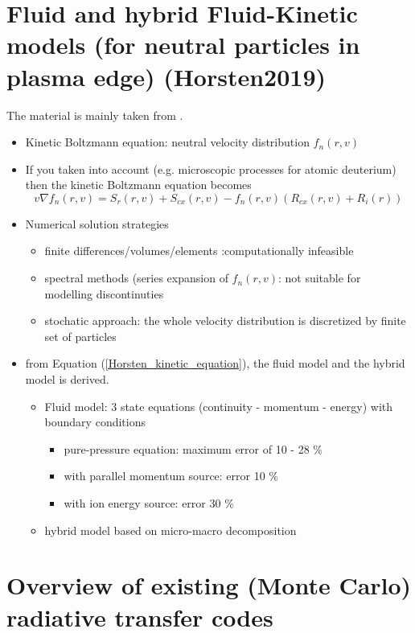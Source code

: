 \documentclass[../main/main.tex]{subfiles}
\begin{document}
\section{Fluid and hybrid Fluid-Kinetic models (for neutral particles in plasma edge) (Horsten2019)}
The material is mainly taken from \cite{HorstenNiels2019}.
\begin{itemize}
\item Kinetic Boltzmann equation: neutral velocity distribution $f_n(r,v)$
\item If you taken into account (e.g. microscopic processes for atomic deuterium) then the kinetic Boltzmann equation becomes 
\begin{equation}
v\nabla f_n(r,v) = S_r(r,v) + S_{cx}(r,v) - f_n(r,v)(R_{cx}(r,v)+R_i(r))
\label{Horsten_kinetic_equation}
\end{equation}

\item Numerical solution strategies
\begin{itemize}
\item finite differences/volumes/elements :computationally infeasible
\item spectral methods (series expansion of $f_n(r,v)$: not suitable for modelling discontinuties
\item stochatic approach: the whole velocity distribution is discretized by finite set of particles
\end{itemize}  

\item from Equation (\ref{Horsten_kinetic_equation}), the fluid model and the hybrid model is derived.
\begin{itemize}
\item Fluid model: 3 state equations (continuity -  momentum - energy) with boundary conditions
\begin{itemize}
\item pure-pressure equation: maximum error of 10 - 28 \% 
\item with parallel momentum source: error 10 \%
\item with ion energy source: error 30 \% 
\end{itemize} 

\item hybrid model based on micro-macro decomposition
\end{itemize}
\end{itemize}

\newpage
\section{Overview of existing (Monte Carlo) radiative transfer codes}
\end{document}
